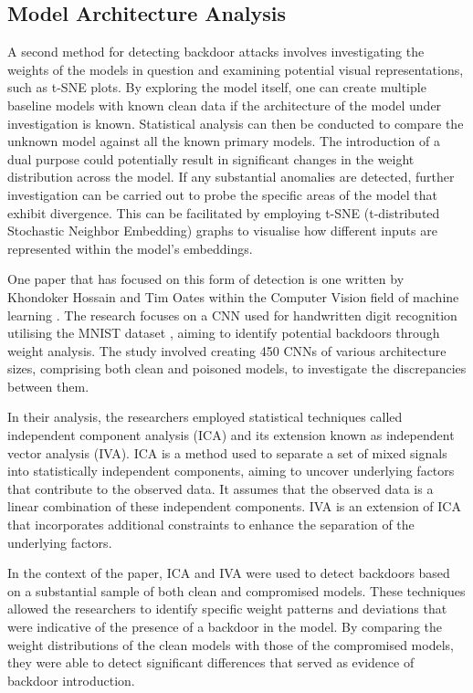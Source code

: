 \subsection{Model Architecture Analysis}

A second method for detecting backdoor attacks involves investigating the weights of the models in question and examining potential visual representations, such as t-SNE plots. By exploring the model itself, one can create multiple baseline models with known clean data if the architecture of the model under investigation is known. Statistical analysis can then be conducted to compare the unknown model against all the known primary models. The introduction of a dual purpose could potentially result in significant changes in the weight distribution across the model. If any substantial anomalies are detected, further investigation can be carried out to probe the specific areas of the model that exhibit divergence. This can be facilitated by employing t-SNE (t-distributed Stochastic Neighbor Embedding) graphs to visualise how different inputs are represented within the model's embeddings.

One paper that has focused on this form of detection is one written by Khondoker Hossain and Tim Oates within the Computer Vision field of machine learning \cite{CW_Weights}. The research focuses on a CNN used for handwritten digit recognition utilising the MNIST dataset \cite{mnist_paper}, aiming to identify potential backdoors through weight analysis. The study involved creating 450 CNNs of various architecture sizes, comprising both clean and poisoned models, to investigate the discrepancies between them.

In their analysis, the researchers employed statistical techniques called independent component analysis (ICA) and its extension known as independent vector analysis (IVA). ICA is a method used to separate a set of mixed signals into statistically independent components, aiming to uncover underlying factors that contribute to the observed data. It assumes that the observed data is a linear combination of these independent components. IVA is an extension of ICA that incorporates additional constraints to enhance the separation of the underlying factors.

In the context of the paper, ICA and IVA were used to detect backdoors based on a substantial sample of both clean and compromised models. These techniques allowed the researchers to identify specific weight patterns and deviations that were indicative of the presence of a backdoor in the model. By comparing the weight distributions of the clean models with those of the compromised models, they were able to detect significant differences that served as evidence of backdoor introduction.

